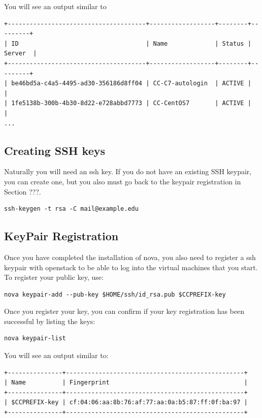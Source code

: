 You will see an output similar to 

\begin{lstlisting}
+--------------------------------------+------------------+--------+---------+
| ID                                   | Name             | Status | Server  |
+--------------------------------------+------------------+--------+---------+
| be46bd5a-c4a5-4495-ad30-356186d8ff04 | CC-C7-autologin  | ACTIVE |         |
| 1fe5138b-300b-4b30-8d22-e728abbd7773 | CC-CentOS7       | ACTIVE |         |
...
\end{lstlisting}

\subsection{Creating SSH keys}

Naturally you will need an ssh key.  If you do not have an existing
SSH keypair, you can create one, but you also must go back to the
keypair registration in Section ???.


\begin{lstlisting}
ssh-keygen -t rsa -C mail@example.edu
\end{lstlisting}

\subsection{KeyPair Registration}

Once you have completed the installation of nova, you also need to
register a ssh keypair with openstack to be able to log into the
virtual machines that you start. To register your public key, use:

\begin{lstlisting}
nova keypair-add --pub-key $HOME/ssh/id_rsa.pub $CCPREFIX-key
\end{lstlisting}

Once you register your key, you can confirm if your key registration
has been successful by listing the keys:

\begin{lstlisting}
nova keypair-list
\end{lstlisting}

You will see an output similar to:

\begin{lstlisting}
+---------------+-------------------------------------------------+
| Name          | Fingerprint                                     |
+---------------+-------------------------------------------------+
| $CCPREFIX-key | cf:04:06:aa:8b:76:af:77:aa:0a:b5:87:ff:0f:ba:97 |
+---------------+-------------------------------------------------+
\end{lstlisting}



